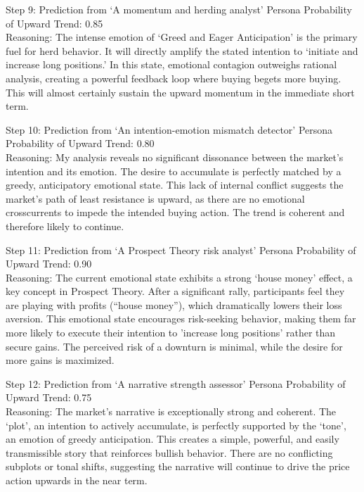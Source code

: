 \documentclass[letterpaper]{article} %
\begin{document}
\begin{actionBox}{Step 9: Prediction from `A momentum and herding analyst' Persona}
    Probability of Upward Trend: 0.85 \\
    Reasoning: The intense emotion of `Greed and Eager Anticipation' is the primary fuel for herd behavior. It will directly amplify the stated intention to `initiate and increase long positions.' In this state, emotional contagion outweighs rational analysis, creating a powerful feedback loop where buying begets more buying. This will almost certainly sustain the upward momentum in the immediate short term.
\end{actionBox}

\begin{actionBox}{Step 10: Prediction from `An intention-emotion mismatch detector' Persona}
    Probability of Upward Trend: 0.80 \\
    Reasoning: My analysis reveals no significant dissonance between the market's intention and its emotion. The desire to accumulate is perfectly matched by a greedy, anticipatory emotional state. This lack of internal conflict suggests the market's path of least resistance is upward, as there are no emotional crosscurrents to impede the intended buying action. The trend is coherent and therefore likely to continue.
\end{actionBox}

\begin{actionBox}{Step 11: Prediction from `A Prospect Theory risk analyst' Persona}
    Probability of Upward Trend: 0.90 \\
    Reasoning: The current emotional state exhibits a strong `house money' effect, a key concept in Prospect Theory. After a significant rally, participants feel they are playing with profits (``house money''), which dramatically lowers their loss aversion. This emotional state encourages risk-seeking behavior, making them far more likely to execute their intention to 'increase long positions' rather than secure gains. The perceived risk of a downturn is minimal, while the desire for more gains is maximized.
\end{actionBox}

\begin{actionBox}{Step 12: Prediction from `A narrative strength assessor' Persona}
    Probability of Upward Trend: 0.75 \\
    Reasoning: The market's narrative is exceptionally strong and coherent. The `plot', an intention to actively accumulate, is perfectly supported by the `tone', an emotion of greedy anticipation. This creates a simple, powerful, and easily transmissible story that reinforces bullish behavior. There are no conflicting subplots or tonal shifts, suggesting the narrative will continue to drive the price action upwards in the near term.
\end{actionBox}
\end{document}
